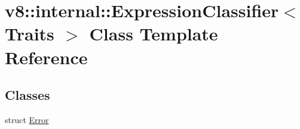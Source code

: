 \hypertarget{classv8_1_1internal_1_1_expression_classifier}{}\section{v8\+:\+:internal\+:\+:Expression\+Classifier$<$ Traits $>$ Class Template Reference}
\label{classv8_1_1internal_1_1_expression_classifier}
\subsection*{Classes}
\begin{DoxyCompactItemize}
\item 
struct \hyperlink{structv8_1_1internal_1_1_expression_classifier_1_1_error}{Error}
\end{DoxyCompactItemize}
